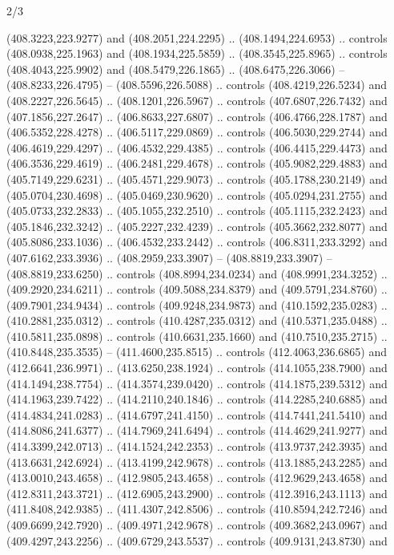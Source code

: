 \begin{flagdescription}{2/3}
\begin{scope}[xshift=0.5\flaglength,yshift=0.5\flagwidth,scale=\flagwidth/495.65]
\begin{scope}[y=0.8pt, x=0.8pt, yscale=-1,shift={(-463.76,-309.78)}]
  (408.3223,223.9277) and (408.2051,224.2295) .. (408.1494,224.6953) .. controls
  (408.0938,225.1963) and (408.1934,225.5859) .. (408.3545,225.8965) .. controls
  (408.4043,225.9902) and (408.5479,226.1865) .. (408.6475,226.3066) --
  (408.8233,226.4795) -- (408.5596,226.5088) .. controls (408.4219,226.5234) and
  (408.2227,226.5645) .. (408.1201,226.5967) .. controls (407.6807,226.7432) and
  (407.1856,227.2647) .. (406.8633,227.6807) .. controls (406.4766,228.1787) and
  (406.5352,228.4278) .. (406.5117,229.0869) .. controls (406.5030,229.2744) and
  (406.4619,229.4297) .. (406.4532,229.4385) .. controls (406.4415,229.4473) and
  (406.3536,229.4619) .. (406.2481,229.4678) .. controls (405.9082,229.4883) and
  (405.7149,229.6231) .. (405.4571,229.9073) .. controls (405.1788,230.2149) and
  (405.0704,230.4698) .. (405.0469,230.9620) .. controls (405.0294,231.2755) and
  (405.0733,232.2833) .. (405.1055,232.2510) .. controls (405.1115,232.2423) and
  (405.1846,232.3242) .. (405.2227,232.4239) .. controls (405.3662,232.8077) and
  (405.8086,233.1036) .. (406.4532,233.2442) .. controls (406.8311,233.3292) and
  (407.6162,233.3936) .. (408.2959,233.3907) -- (408.8819,233.3907) --
  (408.8819,233.6250) .. controls (408.8994,234.0234) and (408.9991,234.3252) ..
  (409.2920,234.6211) .. controls (409.5088,234.8379) and (409.5791,234.8760) ..
  (409.7901,234.9434) .. controls (409.9248,234.9873) and (410.1592,235.0283) ..
  (410.2881,235.0312) .. controls (410.4287,235.0312) and (410.5371,235.0488) ..
  (410.5811,235.0898) .. controls (410.6631,235.1660) and (410.7510,235.2715) ..
  (410.8448,235.3535) -- (411.4600,235.8515) .. controls (412.4063,236.6865) and
  (412.6641,236.9971) .. (413.6250,238.1924) .. controls (414.1055,238.7900) and
  (414.1494,238.7754) .. (414.3574,239.0420) .. controls (414.1875,239.5312) and
  (414.1963,239.7422) .. (414.2110,240.1846) .. controls (414.2285,240.6885) and
  (414.4834,241.0283) .. (414.6797,241.4150) .. controls (414.7441,241.5410) and
  (414.8086,241.6377) .. (414.7969,241.6494) .. controls (414.4629,241.9277) and
  (414.3399,242.0713) .. (414.1524,242.2353) .. controls (413.9737,242.3935) and
  (413.6631,242.6924) .. (413.4199,242.9678) .. controls (413.1885,243.2285) and
  (413.0010,243.4658) .. (412.9805,243.4658) .. controls (412.9629,243.4658) and
  (412.8311,243.3721) .. (412.6905,243.2900) .. controls (412.3916,243.1113) and
  (411.8408,242.9385) .. (411.4307,242.8506) .. controls (410.8594,242.7246) and
  (409.6699,242.7920) .. (409.4971,242.9678) .. controls (409.3682,243.0967) and
  (409.4297,243.2256) .. (409.6729,243.5537) .. controls (409.9131,243.8730) and

\end{scope}
\end{scope}
\end{flagdescription}
